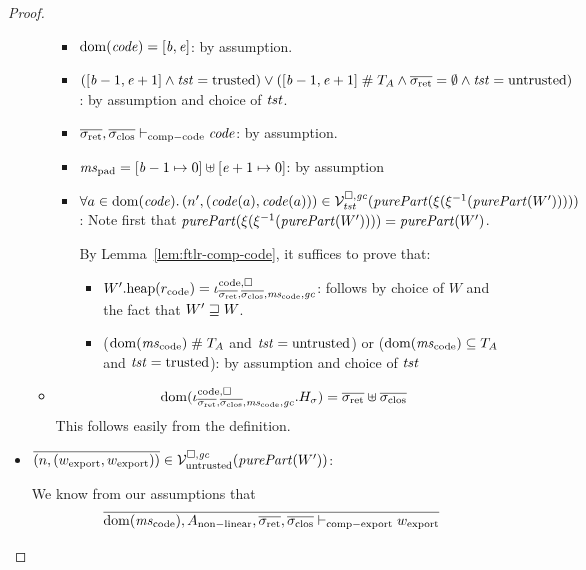 \documentclass[a4paper]{article}
\begin{document}
\begin{proof}
\begin{itemize}
\begin{itemize}
      \begin{itemize}
      \item $\mathrm{dom}(\mathit{code}) = [\mathit{b},\mathit{e}]$: by assumption.
      \item $([\baddr-1,\eaddr+1] \wedge \trust = \trusted) \vee ([\baddr-1,\eaddr+1]\mathrel{\#} \ta \wedge \sigrets = \emptyset \wedge \trust =\untrusted)$: by assumption and choice of $\mathit{tst}$.
      \item $\sigrets,\sigcloss \vdash_{\mathrm{comp-code}} \code$: by assumption.
      \item $\mspad = [\baddr-1 \mapsto 0] \uplus [\eaddr + 1 \mapsto 0]$:
        by assumption
      \item $\forall a \in \dom(\code) \ldotp \npair[n']{(\code(a),\code(a))} \in \lrvg{\trust}(\purePart{}(\xi(\xi^{-1}(\purePart{W'}))))$:
        Note first that $\purePart{}(\xi(\xi^{-1}(\purePart{W'}))) =\purePart{W'}$.

        By Lemma~\ref{lem:ftlr-comp-code}, it suffices to prove that:
        \begin{itemize}
        \item $\pwheap[W'](r_{\mathrm{code}}) = \codereg{\sigrets,\sigcloss,\mscode,\gc}$: follows by choice of $W$ and the fact that $W' \sqsupseteq W$.
        \item ($\dom(\mscode) \mathrel{\#} \ta$ and $\mathit{tst} = \mathrm{untrusted}$) or ($\dom(\mscode) \subseteq \ta$ and $\mathit{tst} = \mathrm{trusted}$): by assumption and choice of $\mathit{tst}$
        \end{itemize}
      \end{itemize}
    \item
      \begin{equation*}
        \dom(\codereg[\mathrm{code},\square]{\sigrets,\sigcloss,\mscode,\gc}.H_\sigma) = \sigrets\uplus \sigcloss
      \end{equation*}
      This follows easily from the definition.
  \end{itemize}
  \item $\overline{\npair{(w_{\mathrm{export}},w_{\mathrm{export}})}} \in \lrv(\purePart{W'})$:

    We know from our assumptions that
    \begin{equation*}
      \overline{\dom(\mscode), A_{\mathrm{non-linear}}, \sigrets,\sigcloss \vdash_{\mathrm{comp-export}} w_{\mathrm{export}}}
    \end{equation*}


\end{itemize}
\end{proof}
\end{document}
